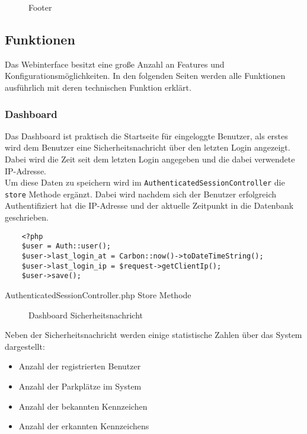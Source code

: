 \begin{figure}[H]
  \centering
  \caption{Footer}
\end{figure}

\subsection{Funktionen}
Das Webinterface besitzt eine große Anzahl an Features und
Konfigurationsmöglichkeiten. In den folgenden Seiten werden alle Funktionen
ausführlich mit deren technischen Funktion erklärt.

\subsubsection{Dashboard}
Das Dashboard ist praktisch die Startseite für eingeloggte Benutzer, als erstes
wird dem Benutzer eine Sicherheitsnachricht über den letzten Login angezeigt.
Dabei wird die Zeit seit dem letzten Login angegeben und die dabei verwendete
IP-Adresse.\\

Um diese Daten zu speichern wird im \verb|AuthenticatedSessionController| die
\verb|store| Methode ergänzt. Dabei wird nachdem sich der Benutzer erfolgreich
Authentifiziert hat die IP-Adresse und der aktuelle Zeitpunkt in die Datenbank
geschrieben.

\begin{listing}[H]
  \begin{verbatim}
    <?php
    $user = Auth::user();
    $user->last_login_at = Carbon::now()->toDateTimeString();
    $user->last_login_ip = $request->getClientIp();
    $user->save();
  \end{verbatim}
  \caption{AuthenticatedSessionController.php Store Methode}
\end{listing}

\begin{figure}[H]
  \centering
  \caption{Dashboard Sicherheitsnachricht}
\end{figure}

Neben der Sicherheitsnachricht werden einige statistische Zahlen über das System
dargestellt:

\begin{itemize}
  \item Anzahl der registrierten Benutzer
  \item Anzahl der Parkplätze im System
  \item Anzahl der bekannten Kennzeichen
  \item Anzahl der erkannten Kennzeichens
\end{itemize}

